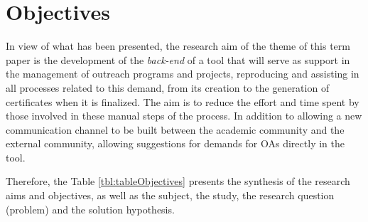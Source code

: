 \section{Objectives}\label{sec:objectives}
% 


In view of what has been presented, the research aim of the theme of this term paper is the development of the \textit{back-end} of a tool that will serve as support in the management of outreach programs and projects, reproducing and assisting in all processes related to this demand, from its creation to the generation of certificates when it is finalized. 
The aim is to reduce the effort and time spent by those involved in these manual steps of the process. 
In addition to allowing a new communication channel to be built between the academic community and the external community, allowing suggestions for demands for \acp{OA} directly in the tool.


Therefore, the Table \ref{tbl:tableObjectives} presents the synthesis of the research aims and objectives, as well as the subject, the study, the research question (problem) and the solution hypothesis.



